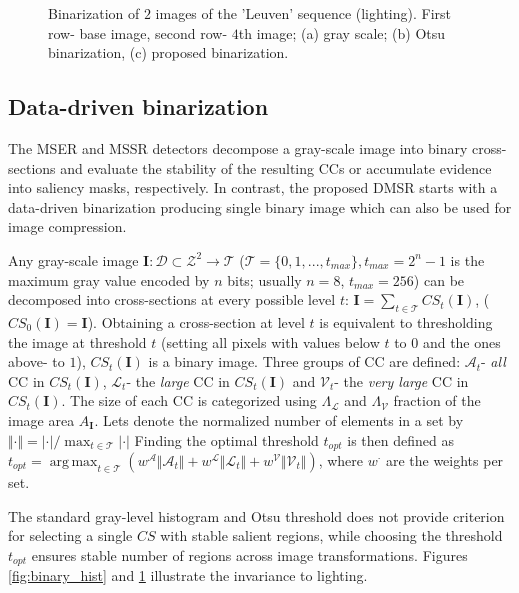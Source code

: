\documentclass{article}
\def\I{{\mathbf I}}
\def\mcT{{\mathcal{T}}}
\def\mcD{{\mathcal{D}}}
\def\mcA{{\mathcal{A}}}
\def\mcL{{\mathcal{L}}}
\def\mcV{{\mathcal{V}}}
\DeclareMathOperator*{\argmax}{arg\,max}
\begin{document}
\begin{figure}[htb]
 \vspace{-0.5cm}
\caption{Binarization of $2$ images of the 'Leuven' sequence (lighting). First row- base image, second row- $4$th image; (a) gray scale; (b) Otsu binarization, (c) proposed binarization.}
\label{fig:leuven_bin}
%
\end{figure}

\subsection{Data-driven binarization}
\label{ssec:binarize}
The MSER and MSSR detectors decompose a gray-scale image into binary cross-sections and evaluate the stability of the resulting CCs or accumulate evidence into saliency masks, respectively. In contrast, the proposed DMSR starts with a data-driven binarization producing single binary image which can also be used for image compression. 

Any gray-scale image  $\I: \mcD \subset \mathcal{Z}^2 \rightarrow \mcT $ ($\mcT = \{0,1, ..., t_{max}\}, t_{max} = 2^n-1$ is the maximum
gray value encoded by $n$ bits; usually $n=8$, $t_{max} = 256$) can be decomposed into cross-sections at
every possible level $t$:  $\I = \sum_{t \in \mcT}CS_t(\I)$, 
($CS_0(\I) = \I$). Obtaining a cross-section at level $t$ is equivalent to thresholding the image at threshold $t$ (setting all pixels with values below $t$ to $0$ and the ones above- to $1$), $CS_t(\I)$ is a binary image. 
Three groups of CC are defined: $\mcA_t$- {\em all} CC in $CS_t(\I)$, $\mcL_t$- the {\em large} CC in $CS_t(\I)$ and 
$\mcV_t$- the {\em very large} CC in $CS_t(\I)$.  The size of each CC is categorized using $\Lambda_{\mcL}$ and $\Lambda_{\mcV}$ fraction of the image area $A_{\I}$. Lets denote the normalized number of elements in a set by $\Vert \cdot \Vert = |\cdot| / \max_{t \in \mcT}|\cdot|$
Finding the optimal threshold $t_{opt}$ is then defined as
$t_{opt} = \argmax_{t \in \mcT}( w^{\mcA} \Vert \mcA_t \Vert + w^{\mcL} \Vert \mcL_t \Vert + w^{\mcV} \Vert \mcV_t \Vert )$,
where $w^{\cdot}$ are the weights per set.  

The standard gray-level histogram and Otsu threshold does not provide criterion for selecting a single $CS$ with stable salient regions, while choosing the threshold $t_{opt}$ ensures stable number of regions across image transformations. Figures \ref{fig:binary_hist} and \ref{fig:leuven_bin} illustrate the invariance to lighting.
 
\end{document}
